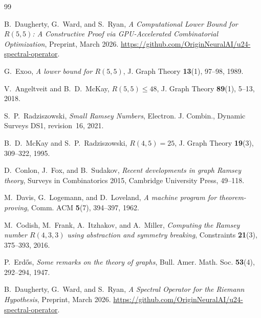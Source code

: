 \documentclass[11pt,a4paper]{article}
\theoremstyle{plain}
\theoremstyle{remark}
\begin{document}

\begin{thebibliography}{99}

B.~Daugherty, G.~Ward, and S.~Ryan,
\emph{A Computational Lower Bound for $R(5,5)$: A Constructive Proof
via GPU-Accelerated Combinatorial Optimization},
Preprint, March 2026.
\url{https://github.com/OriginNeuralAI/u24-spectral-operator}.

G.~Exoo,
\emph{A lower bound for $R(5,5)$},
J. Graph Theory \textbf{13}(1), 97--98, 1989.

V.~Angeltveit and B.~D.~McKay,
\emph{$R(5,5) \leq 48$},
J. Graph Theory \textbf{89}(1), 5--13, 2018.

S.~P.~Radziszowski,
\emph{Small Ramsey Numbers},
Electron. J. Combin., Dynamic Surveys DS1, revision~16, 2021.

B.~D.~McKay and S.~P.~Radziszowski,
\emph{$R(4,5) = 25$},
J. Graph Theory \textbf{19}(3), 309--322, 1995.

D.~Conlon, J.~Fox, and B.~Sudakov,
\emph{Recent developments in graph Ramsey theory},
Surveys in Combinatorics 2015, Cambridge University Press, 49--118.

M.~Davis, G.~Logemann, and D.~Loveland,
\emph{A machine program for theorem-proving},
Comm. ACM \textbf{5}(7), 394--397, 1962.

M.~Codish, M.~Frank, A.~Itzhakov, and A.~Miller,
\emph{Computing the Ramsey number $R(4,3,3)$ using
  abstraction and symmetry breaking},
Constraints \textbf{21}(3), 375--393, 2016.

P.~Erd\H{o}s,
\emph{Some remarks on the theory of graphs},
Bull. Amer. Math. Soc. \textbf{53}(4), 292--294, 1947.

B.~Daugherty, G.~Ward, and S.~Ryan,
\emph{A Spectral Operator for the Riemann Hypothesis},
Preprint, March 2026.
\url{https://github.com/OriginNeuralAI/u24-spectral-operator}.

\end{thebibliography}
\end{document}
